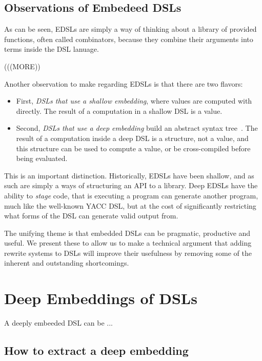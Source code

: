 \documentclass[11pt]{article}
\begin{document}
\subsection{Observations of Embedeed DSLs}

As can be seen, EDSLs are simply a way of thinking about a library
of provided functions, often called combinators, because they combine
their arguments into terms inside the DSL lanuage.


(((MORE))

Another observation to make regarding EDSLs is that
there are two flavors:
\begin{itemize}
\item First, {\em DSLs that use a shallow embedding\/}, where values are computed with directly.
The result of a computation in a shallow DSL is a value.
\item Second, {\em DSLs that use a deep embedding\/} build an abstract syntax tree~\cite{Elliott:03:CompileDSEL-JFP}.
The result of a computation inside a deep DSL
is a structure, not a value, and this structure can be used to compute a value,
or be cross-compiled before being evaluated.
\end{itemize}
This is an important distinction. Historically, EDSLs have been shallow,
and as such are simply a ways of structuring an API to a library. Deep EDSLs
have the ability to {\em stage\/} code, that is executing a program
can generate another program, much like the well-known YACC DSL,
but at the cost of significantly restricting what forms of the DSL can
generate valid output from.

The unifying theme is that embedded DSLs can
be pragmatic, productive and useful. We present
these to allow us to make a technical argument that adding rewrite systems to
DSLs will improve their usefulness by removing
some of the inherent and outstanding shortcomings.

\section{Deep Embeddings of DSLs}

A deeply embeeded DSL can be ...

\subsection{How to extract a deep embedding}
\end{document}
